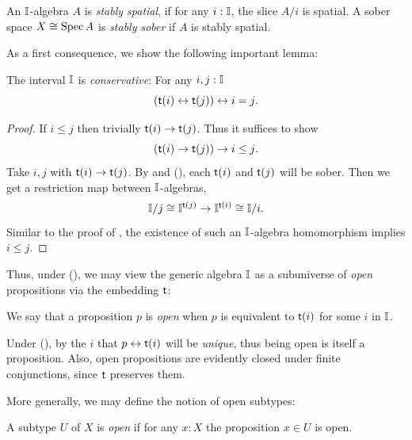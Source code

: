 \begin{definition}
  An $\mathbb{I}$-algebra $A$ is \emph{stably spatial}, if for any $i:\mathbb{I}$, the slice $A/i$ is spatial. A sober space $X \cong \operatorname{Spec} A$ is \emph{stably sober} if $A$ is stably spatial.
\end{definition}

\PrintAxiomSQCI

As a first consequence, we show the following important lemma:

\begin{lemma}[\AxiomSQCI]\label{lem:intconserve}
  The interval $\mathbb{I}$ is \emph{conservative}: For any $i,j : \mathbb{I}$
  \[ (\ist{i} \eq \ist{j}) \eq i = j\text{.} \]
\end{lemma}
\begin{proof}
  If $i \le j$ then trivially $\mathsf{t}(i) \to \mathsf{t}(j)$. Thus it suffices to show
  \[ (\ist{i} \to \ist{j}) \to i \le j\text{.} \]
  Take $i,j$ with $\mathsf{t}(i) \to \mathsf{t}(j)$. By  and (\AxiomSQCI), each $\mathsf{t}(i)$ and $\mathsf{t}(j)$ will be sober. Then we get a restriction map between $\mathbb{I}$-algebras,
  \[ \I/j \cong \I^{\ist{j}} \to \I^{\ist{i}} \cong \I/i\text{.} \]
  Similar to the proof of , the existence of such an $\mathbb{I}$-algebra homomorphism implies $i \le j$. 
\end{proof}

Thus, under (\AxiomSQCI), we may view the generic algebra $\mathbb{I}$ as a subuniverse of \emph{open} propositions via the embedding $\mathsf{t}$:

\begin{definition}
  We say that a proposition $p$ is \emph{open} when $p$ is equivalent to $\mathsf{t}(i)$ for some $i$ in $\mathbb{I}$.
\end{definition}

Under (\AxiomSQCI), by  the $i$ that $p \leftrightarrow \mathsf{t}(i)$ will be \emph{unique}, thus being open is itself a proposition. Also, open propositions are evidently closed under finite conjunctions, since $\mathsf{t}$ preserves them. 

More generally, we may define the notion of open subtypes:

\begin{definition}
  A subtype $U$ of $X$ is \emph{open} if for any $x:X$ the proposition $x\in U$ is open.
\end{definition}

